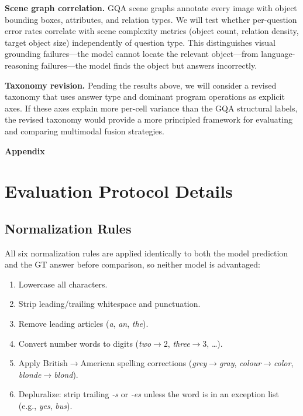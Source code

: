 \documentclass[11pt]{article}
\begin{document}
\textbf{Scene graph correlation.}
GQA scene graphs annotate every image with object bounding boxes, attributes, and relation types. We will test whether per-question error rates correlate with scene complexity metrics (object count, relation density, target object size) independently of question type. This distinguishes visual grounding failures---the model cannot locate the relevant object---from language-reasoning failures---the model finds the object but answers incorrectly.

\textbf{Taxonomy revision.}
Pending the results above, we will consider a revised taxonomy that uses answer type and dominant program operations as explicit axes. If these axes explain more per-cell variance than the GQA structural labels, the revised taxonomy would provide a more principled framework for evaluating and comparing multimodal fusion strategies.




\clearpage
\onecolumn
\appendix

\begin{center}
  {\LARGE\textbf{Appendix}}
\end{center}
\vspace{1em}

\section{Evaluation Protocol Details}
\label{app:eval_protocol}

\subsection{Normalization Rules}
All six normalization rules are applied identically to both the model prediction and the GT answer before comparison, so neither model is advantaged:
\begin{enumerate}[leftmargin=*, topsep=2pt, itemsep=1pt]
  \item Lowercase all characters.
  \item Strip leading/trailing whitespace and punctuation.
  \item Remove leading articles (\emph{a}, \emph{an}, \emph{the}).
  \item Convert number words to digits (\emph{two}$\to$2, \emph{three}$\to$3, \ldots).
  \item Apply British$\to$American spelling corrections (\emph{grey}$\to$\emph{gray}, \emph{colour}$\to$\emph{color}, \emph{blonde}$\to$\emph{blond}).
  \item Depluralize: strip trailing \emph{-s} or \emph{-es} unless the word is in an exception list (e.g., \emph{yes}, \emph{bus}).
\end{enumerate}
\end{document}
